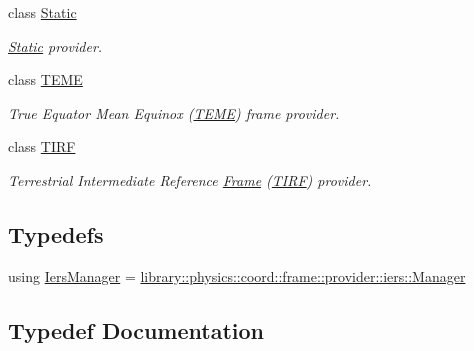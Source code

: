 \begin{DoxyCompactItemize}
class \hyperlink{classlibrary_1_1physics_1_1coord_1_1frame_1_1provider_1_1_static}{Static}
\begin{DoxyCompactList}\small\item\em \hyperlink{classlibrary_1_1physics_1_1coord_1_1frame_1_1provider_1_1_static}{Static} provider. \end{DoxyCompactList}\item 
class \hyperlink{classlibrary_1_1physics_1_1coord_1_1frame_1_1provider_1_1_t_e_m_e}{T\+E\+ME}
\begin{DoxyCompactList}\small\item\em True Equator Mean Equinox (\hyperlink{classlibrary_1_1physics_1_1coord_1_1frame_1_1provider_1_1_t_e_m_e}{T\+E\+ME}) frame provider. \end{DoxyCompactList}\item 
class \hyperlink{classlibrary_1_1physics_1_1coord_1_1frame_1_1provider_1_1_t_i_r_f}{T\+I\+RF}
\begin{DoxyCompactList}\small\item\em Terrestrial Intermediate Reference \hyperlink{classlibrary_1_1physics_1_1coord_1_1_frame}{Frame} (\hyperlink{classlibrary_1_1physics_1_1coord_1_1frame_1_1provider_1_1_t_i_r_f}{T\+I\+RF}) provider. \end{DoxyCompactList}\end{DoxyCompactItemize}
\subsection*{Typedefs}
\begin{DoxyCompactItemize}
\item 
using \hyperlink{namespacelibrary_1_1physics_1_1coord_1_1frame_1_1provider_a15b849528adaef87163ae1ba9daf12ee}{Iers\+Manager} = \hyperlink{classlibrary_1_1physics_1_1coord_1_1frame_1_1provider_1_1iers_1_1_manager}{library\+::physics\+::coord\+::frame\+::provider\+::iers\+::\+Manager}
\end{DoxyCompactItemize}


\subsection{Typedef Documentation}
\mbox{\label{namespacelibrary_1_1physics_1_1coord_1_1frame_1_1provider_a15b849528adaef87163ae1ba9daf12ee}} 
